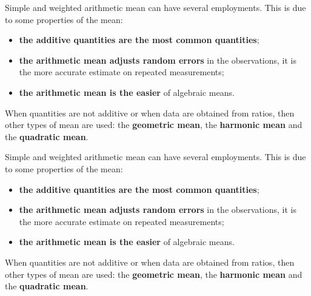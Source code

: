 \begin{frame}
  \vspace{.25cm}
  Simple and weighted arithmetic mean can have several employments. This is due to some properties of the mean:\\
  \vspace{.25cm}
  \begin{itemize}
    \item \textbf{the additive quantities are the most common quantities};\\
    \vspace{.25cm}
    \item \textbf{the arithmetic mean adjusts random errors} in the observations, it is the more accurate estimate on repeated measurements;\\
    \vspace*{.25cm}
    \item \textbf{the arithmetic mean is the easier} of algebraic means.\\
  \end{itemize}
  \vspace{.25cm}
  When quantities are not additive or when data are obtained from ratios, then other types of mean are used: the \textbf{geometric mean}, the \textbf{harmonic mean} and the \textbf{quadratic mean}.
\end{frame}

\begin{frame}
  \vspace{.25cm}
  Simple and weighted arithmetic mean can have several employments. This is due to some properties of the mean:\\
  \vspace{.25cm}
  \begin{itemize}
    \item \textbf{the additive quantities are the most common quantities};\\
    \vspace{.25cm}
    \item \textbf{the arithmetic mean adjusts random errors} in the observations, it is the more accurate estimate on repeated measurements;\\
    \vspace*{.25cm}
    \item \textbf{the arithmetic mean is the easier} of algebraic means.\\
  \end{itemize}
  \vspace{.25cm}
  When quantities are not additive or when data are obtained from ratios, then other types of mean are used: the \textbf{geometric mean}, the \textbf{harmonic mean} and the \textbf{quadratic mean}.
\end{frame}


